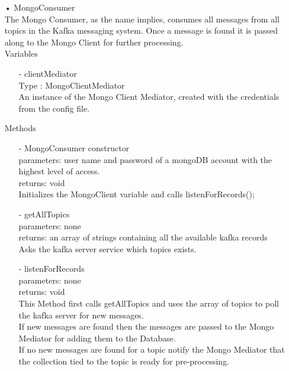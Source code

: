 \documentclass[twoside, english, draft]{design}
\begin{document}
\begin{itemize}
		
	\item[•]MongoConsumer
	\\The Mongo Consumer, as the name implies, consumes all messages from all topics in the Kafka messaging system. Once a message is found it is passed along to the Mongo Client for further processing.
	\\Variables
	\begin{itemize}
			\item[-]clientMediator
			\\Type : MongoClientMediator
			\\ An instance of the Mongo Client Mediator, created with the credentials from the config file.
	\end{itemize}
	Methods
	\begin{itemize}
			\item[-]MongoConsumer constructor
			\\parameters: user name and password of a mongoDB account with the highest level of access. 
			\\returns: void
			\\ Initializes the MongoClient variable and calls listenForRecords();
			\item[-]getAllTopics
			\\parameters: none
			\\returns: an array of strings containing all the available kafka records
			\\Asks the kafka server service which topics exists.
			\item[-]listenForRecords
			\\parameters: none
			\\returns: void
			\\This Method first calls getAllTopics and uses the array of topics to poll the kafka server for new messages.
			\\If new messages are found then the messages are passed to the Mongo Mediator for adding them to the Database.
			\\If no new messages are found for a topic notify the Mongo Mediator that the collection tied to the topic is ready for pre-processing.
	\end{itemize}
	

\end{itemize}
\end{document}

